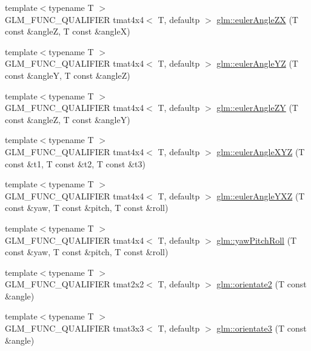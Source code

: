 \begin{DoxyCompactItemize}
\item 
{\footnotesize template$<$typename T $>$ }\\G\+L\+M\+\_\+\+F\+U\+N\+C\+\_\+\+Q\+U\+A\+L\+I\+F\+I\+ER tmat4x4$<$ T, defaultp $>$ \hyperlink{group__gtx__euler__angles_gaef83cf40bd9ae780011b29970f16f622}{glm\+::euler\+Angle\+ZX} (T const \&angleZ, T const \&angleX)
\item 
{\footnotesize template$<$typename T $>$ }\\G\+L\+M\+\_\+\+F\+U\+N\+C\+\_\+\+Q\+U\+A\+L\+I\+F\+I\+ER tmat4x4$<$ T, defaultp $>$ \hyperlink{group__gtx__euler__angles_ga1033f84f51d61646145352ef0c1bb58c}{glm\+::euler\+Angle\+YZ} (T const \&angleY, T const \&angleZ)
\item 
{\footnotesize template$<$typename T $>$ }\\G\+L\+M\+\_\+\+F\+U\+N\+C\+\_\+\+Q\+U\+A\+L\+I\+F\+I\+ER tmat4x4$<$ T, defaultp $>$ \hyperlink{group__gtx__euler__angles_ga02f037926568bbd12dfece3b28b20343}{glm\+::euler\+Angle\+ZY} (T const \&angleZ, T const \&angleY)
\item 
{\footnotesize template$<$typename T $>$ }\\G\+L\+M\+\_\+\+F\+U\+N\+C\+\_\+\+Q\+U\+A\+L\+I\+F\+I\+ER tmat4x4$<$ T, defaultp $>$ \hyperlink{group__gtx__euler__angles_gaaedda1657a1aebe0a904d864b33844e8}{glm\+::euler\+Angle\+X\+YZ} (T const \&t1, T const \&t2, T const \&t3)
\item 
{\footnotesize template$<$typename T $>$ }\\G\+L\+M\+\_\+\+F\+U\+N\+C\+\_\+\+Q\+U\+A\+L\+I\+F\+I\+ER tmat4x4$<$ T, defaultp $>$ \hyperlink{group__gtx__euler__angles_ga0242b5ab68651db70c6025815549427f}{glm\+::euler\+Angle\+Y\+XZ} (T const \&yaw, T const \&pitch, T const \&roll)
\item 
{\footnotesize template$<$typename T $>$ }\\G\+L\+M\+\_\+\+F\+U\+N\+C\+\_\+\+Q\+U\+A\+L\+I\+F\+I\+ER tmat4x4$<$ T, defaultp $>$ \hyperlink{group__gtx__euler__angles_gaf9c8d0f1df88c5344165600774489bc5}{glm\+::yaw\+Pitch\+Roll} (T const \&yaw, T const \&pitch, T const \&roll)
\item 
{\footnotesize template$<$typename T $>$ }\\G\+L\+M\+\_\+\+F\+U\+N\+C\+\_\+\+Q\+U\+A\+L\+I\+F\+I\+ER tmat2x2$<$ T, defaultp $>$ \hyperlink{group__gtx__euler__angles_ga6f465681cbbc575ad93a53ec918dacf3}{glm\+::orientate2} (T const \&angle)
\item 
{\footnotesize template$<$typename T $>$ }\\G\+L\+M\+\_\+\+F\+U\+N\+C\+\_\+\+Q\+U\+A\+L\+I\+F\+I\+ER tmat3x3$<$ T, defaultp $>$ \hyperlink{group__gtx__euler__angles_gab188e2526dea3c003e86e298f618085e}{glm\+::orientate3} (T const \&angle)

\end{DoxyCompactItemize}
